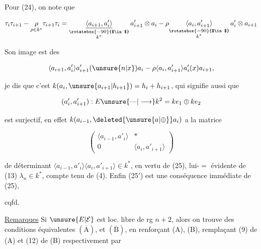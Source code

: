 Pour (24), on note que

\[\tau_i\tau_{i+1}-\underset{\rho\in k^*}{\rho}\tau_{i+1}\tau_i=\underset{\substack{\rotatebox{-90}{$\in$}\\ k^*}}{\underline{\langle a_{i+1},a'_i\rangle}}\,a'_{i+1}\otimes a_i-\rho\underset{\substack{\rotatebox{-90}{$\in$}\\ k^*}}{\langle a_i,a'_{i+1}\rangle}\,a'_i\otimes a_{i+1}\]


Son image est  des

\[\langle a_{i+1},a'_i\rangle a'_{i+1}(\unsure{n|x})a_i-\rho\langle a_i,a'_{i+1}\rangle a'_i(x)a_{i+1},\]

je dis que c'est $k(a_i,\unsure{a_{i+1}|h_{i+1}})=h_i+h_{i+1}$,  qui  signifie aussi que

\[(a'_i,a'_{i+1}):E\unsure{\text{---}|\longrightarrow} k^2=ke_1\oplus ke_2\]

est surjectif, en effet   $k(a_{i-1},\deleted{\unsure{a|\oplus}}a_i)$ a la matrice 

\[\begin{pmatrix}\langle a_{i-1},a'_i\rangle&*\\0&\langle a_i,a'_{i+1}\rangle\end{pmatrix}\]

de déterminant $\langle a_{i-1},a'_i\rangle\langle a_i,a'_{i+1}\rangle\in k^*$, en vertu de (25), lui-$=$  évidente de (13) $\lambda_n\in k^*$, compte tenu de (4). Enfin (25$'$) est une conséquence immédiate de (25),

cqfd.


\uline{Remarques} Si $\unsure{E|\mathcal E}$ est loc. libre de rg $n+2$, alors on trouve des conditions équivalentes $(\overline{\mathrm A})$,  et $(\overline{\mathrm B})$, en renforçant (A), (B), remplaçant (9) de (A) et (12) de (B) respectivement par

